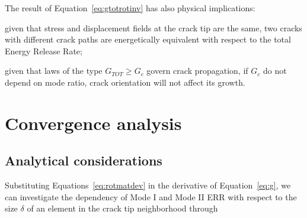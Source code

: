 \documentclass[review]{elsarticle}
\begin{document}
The result of Equation~\ref{eq:gtotrotinv} has also physical implications:

\begin{itemize}[\label={--}]
\item given that stress and displacement fields at the crack tip are the same, two cracks with different crack paths are energetically equivalent with respect to the total Energy Release Rate;
\item given that laws of the type $G_{TOT}\geq G_{c}$ govern crack propagation, if $G_{c}$ do not depend on mode ratio, crack orientation will not affect its growth.
\end{itemize}

\section{Convergence analysis}

\subsection{Analytical considerations}

Substituting Equations~\ref{eq:rotmatdev} in the derivative of Equation~\ref{eq:g}, we can investigate the dependency of Mode I and Mode II ERR with respect to the size $\delta$ of an element in the crack tip neighborhood through 
\end{document}
